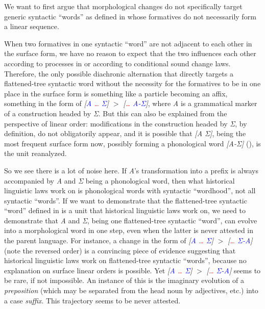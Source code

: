 \documentclass[a4paper, oneside, scheme=plain, 12pt]{article}
\newcommand{\form}[1]{\emph{#1}}
\newcommand*{\textgt}{$>$ }
\begin{document}
We want to first argue that morphological changes do not specifically target
generic syntactic ``words'' as defined in 
whose formatives do not necessarily form a linear sequence.

When two formatives in one syntactic ``word'' are not adjacent to each other in the surface form,
we have no reason to expect that the two influences each other according to processes in 
or according to conditional sound change laws.
Therefore, the only possible diachronic alternation that directly targets a flattened-tree syntactic word
without the necessity for the formatives to be in one place in the surface form
is something like a particle becoming an affix, 
something in the form of \form{[\textcolor{blue}{A} \textcolor{red}{\dots} \textcolor{blue}{Σ}]} \textgt \form{[\textcolor{red}{\dots} \textcolor{blue}{A-Σ}]},
where \form{A} is a grammatical marker of a construction headed by \form{Σ}.
But this can also be explained from the perspective of linear order:
modifications in the construction headed by \form{Σ}, by definition, do not obligatorily appear,
and it is possible that \form{[A Σ]}, being the most frequent surface form now, possibly forming a phonological word \form{[A-Σ]} (), is the unit reanalyzed. 

So we see there is a lot of noise here.
If \form{A}'s transformation into a prefix is always accompanied by \form{A} and \form{Σ} being a phonological word,
then what historical linguistic laws work on is phonological words with syntactic ``wordhood'',
not all syntactic ``words''.
If we want to demonstrate that the flattened-tree syntactic ``word'' defined in 
is a unit that historical linguistic laws work on,
we need to demonstrate that \form{A} and \form{Σ}, being one flattened-tree syntactic ``word'', can evolve into a morphological word in one step,
even when the latter is never attested in the parent language.
For instance, a change in the form of \form{[\textcolor{blue}{A} \textcolor{red}{\dots} \textcolor{blue}{Σ}]} \textgt \form{[\textcolor{red}{\dots} \textcolor{blue}{Σ-A}]} (note the reversed order)
is a convincing piece of evidence suggesting that historical linguistic laws work on flattened-tree syntactic ``words'',
because no explanation on surface linear orders is possible.
Yet \form{[\textcolor{blue}{A} \textcolor{red}{\dots} \textcolor{blue}{Σ}]} \textgt \form{[\textcolor{red}{\dots} \textcolor{blue}{Σ-A}]} seems to be rare, if not impossible.
An instance of this is the imaginary evolution of a \emph{preposition} (which may be separated from the head noun by adjectives, etc.) into a case \emph{suffix}.
This trajectory seems to be never attested.
\end{document}
